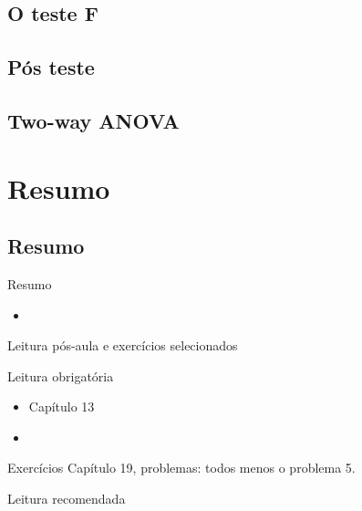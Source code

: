 \documentclass{beamer}
\begin{document}

\subsection{O teste F}

\subsection{Pós teste}

\subsection{Two-way ANOVA}

\section{Resumo}

\subsection{Resumo}

\begin{frame}{Resumo}
  \begin{itemize}
  \item
  \end{itemize}
\end{frame}

\begin{frame}{Leitura pós-aula e exercícios selecionados}
  \begin{block}{Leitura obrigatória}
    \begin{itemize}
    \item Capítulo 13
    \item 
    \end{itemize}
  \end{block}
  \begin{block}{Exercícios}
    Capítulo 19, problemas: todos menos o problema 5.
  \end{block}
  \begin{block}{Leitura recomendada}
  \end{block}
\end{frame}
\end{document}
